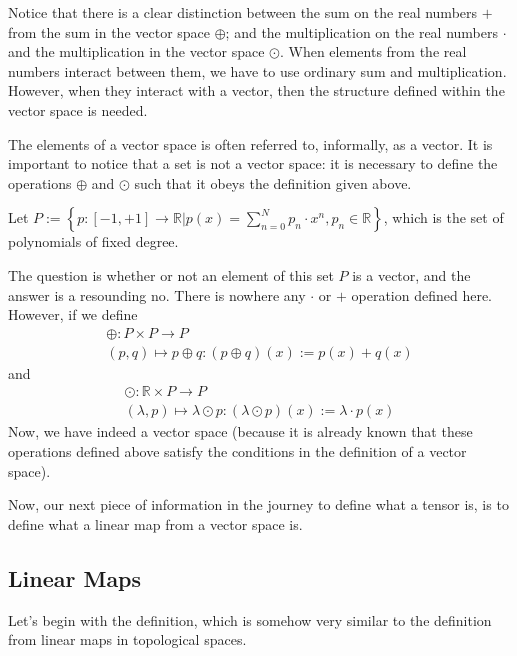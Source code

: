 Notice that there is a clear distinction between the sum on the real numbers $+$ from the sum in the vector space $\oplus$; and the multiplication on the real numbers $\cdot$ and the multiplication in the vector space $\odot$. When elements from the real numbers interact between them, we have to use ordinary sum and multiplication. However, when they interact with a vector, then the structure defined within the vector space is needed. 

\begin{remark}
    The elements of a vector space is often referred to, informally, as a vector. It is important to notice that a set is not a vector space: it is necessary to define the operations $\oplus$ and $\odot$ such that it obeys the definition given above. 
\end{remark}

\begin{example}
    Let $P:=\left\{ p: [-1, +1] \longrightarrow \mathbb{R} \Big| p(x) = \sum_{n=0}^N p_n \cdot x^n, p_n \in \mathbb{R} \right\}$, which is the set of polynomials of fixed degree.

    The question is whether or not an element of this set $P$ is a vector, and the answer is a resounding no. There is nowhere any $\cdot$ or $+$ operation defined here. However, if we define
    \begin{align*}
        \oplus : P \times P \longrightarrow P \\
        (p,q) \longmapsto p \oplus q: (p \oplus q)(x) := p(x) + q(x)
    \end{align*}
    and 
    \begin{align*}
        \odot : \mathbb{R} \times P \longrightarrow P \\
        (\lambda,p) \longmapsto \lambda \odot p: (\lambda \odot p)(x) := \lambda \cdot p(x) 
    \end{align*}
    Now, we have indeed a vector space (because it is already known that these operations defined above satisfy the conditions in the definition of a vector space).
    \qedwhite
\end{example}

Now, our next piece of information in the journey to define what a tensor is, is to define what a linear map from a vector space is.

\subsection{Linear Maps}
Let's begin with the definition, which is somehow very similar to the definition from linear maps in topological spaces.

